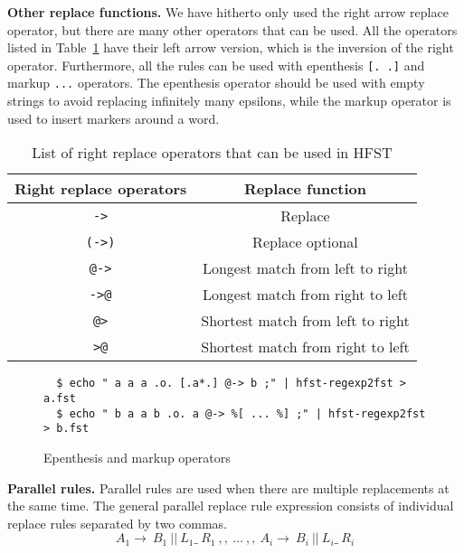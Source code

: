 \documentclass{llncs}
\begin{document}

\textbf{Other replace functions.} We have hitherto only used the right arrow replace operator,
but there are many other operators that can be used. 
All the operators listed in Table~\ref{tab:replace_operators} have their left arrow version, 
which is the inversion of the right operator. Furthermore, all the rules can be used 
with epenthesis \verb![. .]! and markup \verb!...! operators. 
The epenthesis operator should be used with empty strings to avoid replacing infinitely 
many epsilons, while the markup operator is used to insert markers around a word.

\begin{table} [h!]
  \centering
  \caption{List of right replace operators that can be used in HFST}
  \begin{tabular}{| c | c |} 
    \hline
    Right replace operators & Replace function \\ \hline\hline
    \verb!->!   & Replace \\ \hline
    \verb!(->)! & Replace optional \\ \hline
    \verb!@->!  & Longest match from left to right \\ \hline
    \verb!->@!  & Longest match from right to left \\ \hline
    \verb!@>!   & Shortest match from left to right \\ \hline
    \verb!>@!   & Shortest match from right to left \\ \hline
  \end{tabular}
  \label{tab:replace_operators}
\end{table}



\begin{figure} [h!]
\begin{verbatim}
  $ echo " a a a .o. [.a*.] @-> b ;" | hfst-regexp2fst > a.fst
  $ echo " b a a b .o. a @-> %[ ... %] ;" | hfst-regexp2fst > b.fst
\end{verbatim}
\caption{Epenthesis and markup operators}
\label{fig:epenthesis_markup}
\end{figure}



\textbf{Parallel rules.} Parallel rules are used when there are 
multiple replacements at the same time. The general parallel replace rule expression 
consists of individual replace rules separated by two commas.
\begin{equation}
  A_1 \rightarrow\ B_1\ ||\ L_1 \_\  R_1\ ,,\ \ldots\ ,,\ A_i \rightarrow\ B_i\ ||\ L_i \_\ R_i
\end{equation}
\end{document}
